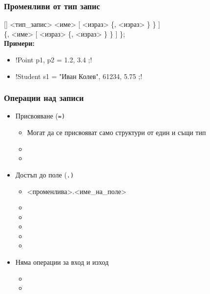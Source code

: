 \documentclass{beamer}
\begin{document}
\begin{frame}[fragile]
  \frametitle{Променливи от тип запис}

  [] <тип\_запис> <име> [ \tta{= \{} <израз> \{\tta, <израз> \} \tta\} ]\\
  \hspace{20ex} \{\tta, <име> [ \tta{= \{} <израз> \{\tta, <израз> \} \tta\} ] \}\tta;\\[2em]
  \pause
  \textbf{Примери:}
  \begin{itemize}[<+->]
  \item \lst!Point p1, p2 = { 1.2, 3.4 };!
  \item \lst!Student s1 = { "Иван Колев", 61234, 5.75 };!
  \end{itemize}
\end{frame}

\begin{frame}
  \frametitle{Операции над записи}

  \begin{itemize}[<+->]
  \item Присвояване (\tt=)
    \begin{itemize}
    \item Могат да се присвояват само структури от един и същи тип
    \item {}
    \item {}
    \end{itemize}
  \item Достъп до поле (\tt.)
    \begin{itemize}
    \item{} <променлива>\tta.<име\_на\_поле>
    \item {}
    \item {}
    \item {}
    \item {}
    \item {}
    \end{itemize}
  \item Няма операции за вход и изход
    \begin{itemize}
    \item {}
    \item {}
    \end{itemize}
  \end{itemize}
\end{frame}
\end{document}
